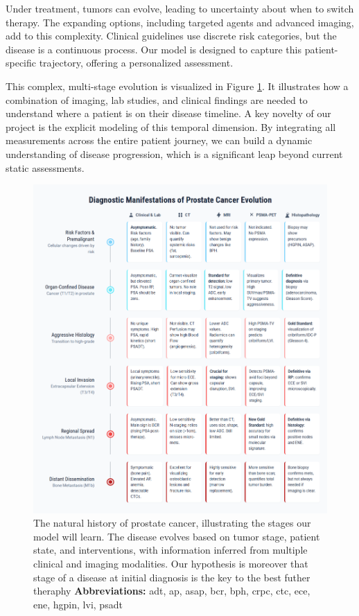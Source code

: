\documentclass[11pt, a4paper]{article}
\begin{document}
Under treatment, tumors can evolve, leading to uncertainty about when to switch therapy. The expanding options, including targeted agents and advanced imaging, add to this complexity. Clinical guidelines use discrete risk categories, but the disease is a continuous process. Our model is designed to capture this patient-specific trajectory, offering a personalized assessment.

This complex, multi-stage evolution is visualized in Figure \ref{fig:prostate_evolution}. It illustrates how a combination of imaging, lab studies, and clinical findings are needed to understand where a patient is on their disease timeline. A key novelty of our project is the explicit modeling of this temporal dimension. By integrating all measurements across the entire patient journey, we can build a dynamic understanding of disease progression, which is a significant leap beyond current static assessments.

\begin{figure}[H]
    \centering
    \includegraphics[width=\textwidth]{pe.png}
    \caption{The natural history of prostate cancer, illustrating the stages our model will learn. The disease evolves based on tumor stage, patient state, and interventions, with information inferred from multiple clinical and imaging modalities. Our hypothesis is moreover that stage of a disease at initial diagnosis is the key to the best futher theraphy \textbf{Abbreviations:} \gls{adt}, \gls{ap}, \gls{asap}, \gls{bcr}, \gls{bph}, \gls{crpc}, \gls{ctc}, \gls{ece}, \gls{ene}, \gls{hgpin}, \gls{lvi}, \gls{psadt}}
    \label{fig:prostate_evolution}
\end{figure}
\end{document}
